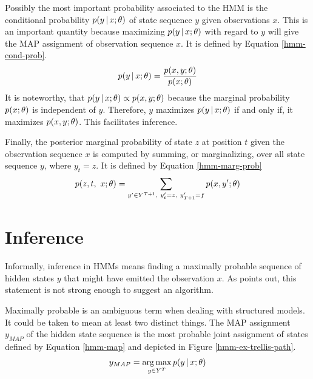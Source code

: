 Possibly the most important probability associated to the HMM is the
conditional probability $p(y\mbox{$ \, | \, $} x\mbox{$ ; \, $}\theta)$ of state sequence $y$
given observations $x$. This is an important quantity because
maximizing $p(y\mbox{$ \, | \, $} x\mbox{$ ; \, $}\theta)$ with regard to $y$ will give the MAP
assignment of observation sequence $x$. It is defined by Equation
\eqref{hmm-cond-prob}.
\begin{equation}
p(y\mbox{$ \, | \, $} x\mbox{$ ; \, $}\theta) = \frac{p(x,y\mbox{$ ; \, $}\theta)}{p(x\mbox{$ ; \, $}\theta)}\label{hmm-cond-prob}
\end{equation}
It is noteworthy, that $p(y\mbox{$ \, | \, $} x\mbox{$ ; \, $}\theta) \propto p(x,y\mbox{$ ; \, $}\theta)$ because the marginal probability $p(x\mbox{$ ; \, $}\theta)$ is independent of $y$. Therefore, $y$ maximizes $p(y\mbox{$ \, | \, $} x\mbox{$ ; \, $}\theta)$ if and only if, it maximizes $p(x,y\mbox{$ ; \, $}\theta)$. This facilitates inference.

Finally, the posterior marginal probability of state $z$ at position $t$ given
the observation sequence $x$ is computed by summing, or marginalizing,
over all state sequence $y$, where $y_t = z$. It is defined by
Equation \eqref{hmm-marg-prob}
\begin{equation}
p(z, t,\ x\mbox{$ ; \, $} \theta) = \sum_{y' \in Y^{T+1},\ y'_t = z,\ y'_{T+1} = f} p(x, y'\mbox{$ ; \, $} \theta)\label{hmm-marg-prob}
\end{equation}

\section{Inference}
Informally, inference in HMMs means finding a maximally
probable sequence of hidden states $y$ that might have emitted the
observation $x$. As \cite{Rabiner1989} points out, this statement is
not strong enough to suggest an algorithm. 

Maximally probable is an ambiguous term when dealing with structured
models. It could be taken to mean at least two distinct things. The
MAP assignment $y_{MAP}$ of the hidden state sequence is the most
probable joint assignment of states defined by Equation
\eqref{hmm-map} and depicted in Figure
\ref{hmm-ex-trellis-path}. 
\begin{equation}
y_{MAP} = \operatorname*{arg\,max}_{y\in Y^T} p(y\mbox{$ \, | \, $} x\mbox{$ ; \, $}\theta)\label{hmm-map}
\end{equation}

